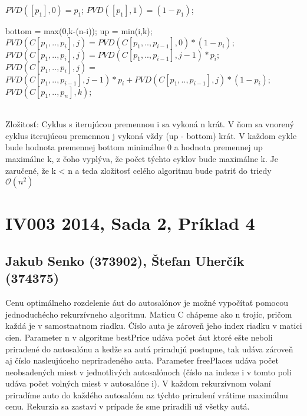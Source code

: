 \documentclass[paper=a4, fontsize=11pt]{scrartcl} %
\numberwithin{equation}{section} %
\numberwithin{figure}{section} %
\numberwithin{table}{section} %
\begin{document}
\begin{algorithmic}[1]
		\State $PVD([p_1],0) = p_1$;
		\State $PVD([p_1],1) = (1-p_1)$;

			\State bottom = max(0,k-(n-i));
			\State up = min(i,k);
					\State $PVD(C[p_1,..,p_{i}],j) = PVD(C[p_1,..,p_{i-1}],0)*(1-p_i);$
				\Else {}
					\State $PVD(C[p_1,..,p_{i}],j) = PVD(C[p_1,..,p_{i-1}],j-1)*p_i;$
				\Else 
					\State $PVD(C[p_1,..,p_{i}],j) = $
					\State $PVD(C[p_1,..,p_{i-1}],j-1)*p_i + PVD(C[p_1,..,p_{i-1}],j)*(1-p_i);$
				\EndIf \EndIf
			\EndFor
		\EndFor
		\State \Return $PVD(C[p_{1},..,p_{n}],k);$
	\EndFunction
\end{algorithmic}
\ \\
Zložitosť:
Cyklus s iterujúcou premennou i sa vykoná n krát.
V ňom sa vnorený cyklus iterujúcou premennou j vykoná vždy (up - bottom) krát.
V každom cykle bude hodnota premennej bottom minimálne 0 a hodnota premennej up maximálne k, z čoho vyplýva, že počet týchto cyklov bude maximálne k.
Je zaručené, že k < n a teda zložitosť celého algoritmu bude patriť do triedy $\mathcal{O}(n^2)$


\pagebreak


\section*{IV003 2014, Sada 2, Príklad 4}
\subsection*{Jakub Senko (373902), Štefan Uherčík (374375)}

Cenu optimálneho rozdelenie áut do autosalónov je možné vypočítať pomocou jednoduchécho rekurzívneho algoritmu.
Maticu C chápeme ako n trojíc, pričom každá je v samostnatnom riadku. Číslo auta je zároveň jeho index riadku v matici cien.
Parameter n v algoritme bestPrice udáva počet áut ktoré ešte neboli priradené do autosalónu a kedže sa autá priradujú postupne, tak udáva zároveň aj číslo nasleujúceho nepriradeného auta.
Parameter freePlaces udáva počet neobsadených miest v jednotlivých autosalónoch (číslo na indexe i v tomto poli udáva počet volných miest v autosalóne i).
V každom rekurzívnom volaní priradíme auto do každého autosalónu az týchto priradení vrátime maximálnu cenu.
Rekurzia sa zastaví v prípade že sme priradili už všetky autá.
\end{document}
